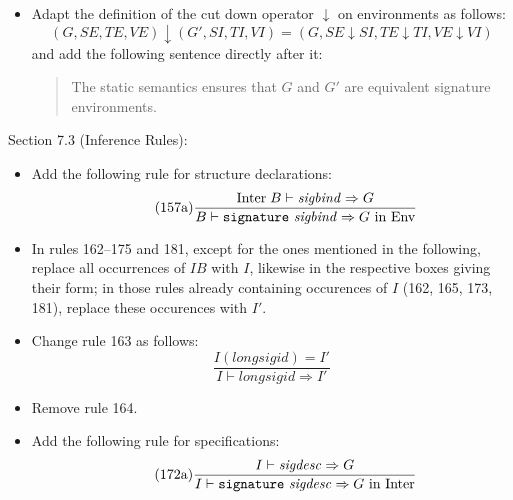 \documentclass[twoside,titlepage]{article}
\begin{document}
\begin{appendix}
\begin{itemize}
\item Adapt the definition of the cut down operator $\downarrow$ on environments as follows:
  $$
  (G,\mathit{SE},\mathit{TE},\mathit{VE}) \downarrow (G',\mathit{SI},\mathit{TI},\mathit{VI}) = (G,\mathit{SE}\downarrow\mathit{SI},\mathit{TE}\downarrow\mathit{TI},\mathit{VE}\downarrow\mathit{VI})
  $$
  and add the following sentence directly after it:
  \begin{quote}
  The static semantics ensures that $G$ and $G'$ are equivalent signature environments.
  \end{quote}
\end{itemize}

Section 7.3 (Inference Rules):
\begin{itemize}
\item Add the following rule for structure declarations:
  \begin{equation}
  \tag{157a}
  \frac{
  \mbox{Inter}\;B \vdash \mathit{sigbind} \Rightarrow G
  }{
  B \vdash {\tt{signature}}~\mathit{sigbind} \Rightarrow \mbox{$G$ in Env}
  }
  \end{equation}

\item In rules 162--175 and 181, except for the ones mentioned in the following, replace all occurrences of $\mathit{IB}$ with $I$, likewise in the respective boxes giving their form; in those rules already containing occurences of $I$ (162, 165, 173, 181), replace these occurences with $I'$.

\item Change rule 163 as follows:
  \begin{equation}
  \tag{163}
  \frac{
  I(\mathit{longsigid}) = I'
  }{
  I \vdash \mathit{longsigid} \Rightarrow I'
  }
  \end{equation}

\item Remove rule 164.

\item Add the following rule for specifications:
  \begin{equation}
  \tag{172a}
  \frac{
  I \vdash \mathit{sigdesc} \Rightarrow G
  }{
  I \vdash {\tt{signature}}~\mathit{sigdesc} \Rightarrow \mbox{$G$ in Inter}
  }
  \end{equation}


\end{itemize}
\end{appendix}
\end{document}
